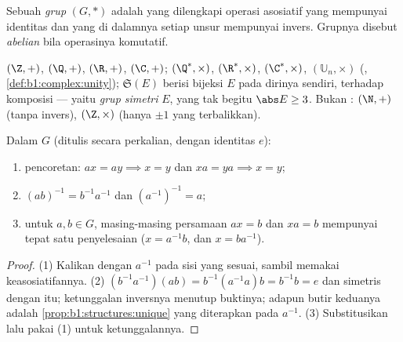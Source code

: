 \begin{definition}[Grup]\label{def:b1:structures:group}
Sebuah \emph{grup} $(G, *)$ adalah  yang dilengkapi operasi asosiatif
yang mempunyai identitas dan yang di dalamnya setiap unsur mempunyai invers. Grupnya
disebut \emph{abelian} bila operasinya
komutatif.
\end{definition}

\begin{example}\label{ex:b1:structures:groups}
$(\Z, +)$, $(\Q, +)$, $(\R, +)$, $(\C, +)$; $(\Q^*, \times)$,
$(\R^*, \times)$, $(\C^*, \times)$, $(\mathbb{U}_n, \times)$ (, \cref{def:b1:complex:unity});  $\mathfrak{S}(E)$ berisi
bijeksi  $E$ pada dirinya sendiri, terhadap komposisi --- yaitu
\emph{grup simetri} $E$, yang tak  begitu
$\abs E \geq 3$. Bukan : $(\N, +)$ (tanpa invers),
$(\Z, \times)$ (hanya $\pm 1$ yang terbalikkan).
\end{example}

\begin{proposition}\label{prop:b1:structures:rules}
Dalam  $G$ (ditulis secara perkalian, dengan identitas $e$):
\begin{enumerate}
  \item pencoretan: $ax = ay \implies x = y$ dan $xa = ya \implies
        x = y$;
  \item $(ab)^{-1} = b^{-1} a^{-1}$ dan $(a^{-1})^{-1} = a$;
  \item untuk $a, b \in G$, masing-masing persamaan $ax = b$ dan $xa = b$ mempunyai
        tepat satu penyelesaian ($x = a^{-1}b$, dan $x = b a^{-1}$).
\end{enumerate}
\end{proposition}

\begin{proof}
(1) Kalikan dengan $a^{-1}$ pada sisi yang sesuai, sambil memakai
keasosiatifannya. (2) $(b^{-1}a^{-1})(ab) = b^{-1}(a^{-1}a)b = b^{-1}b =
e$ dan simetris dengan itu; ketunggalan inversnya menutup buktinya; adapun butir
keduanya adalah \cref{prop:b1:structures:unique} yang diterapkan pada $a^{-1}$. (3)
Substitusikan lalu pakai (1) untuk ketunggalannya.
\end{proof}

